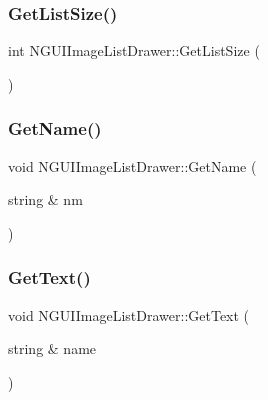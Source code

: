 \subsubsection{\texorpdfstring{Get\+List\+Size()}{GetListSize()}}
{\footnotesize\ttfamily int N\+G\+U\+I\+Image\+List\+Drawer\+::\+Get\+List\+Size (\begin{DoxyParamCaption}{ }\end{DoxyParamCaption})}

\hypertarget{class_n_g_u_i_image_list_drawer_a02cfec1a6feb717bedfef1183a0b411e}{}\label{class_n_g_u_i_image_list_drawer_a02cfec1a6feb717bedfef1183a0b411e} 
\subsubsection{\texorpdfstring{Get\+Name()}{GetName()}}
{\footnotesize\ttfamily void N\+G\+U\+I\+Image\+List\+Drawer\+::\+Get\+Name (\begin{DoxyParamCaption}\item[{string \&}]{nm }\end{DoxyParamCaption})}

\hypertarget{class_n_g_u_i_image_list_drawer_a84292773acd499aa26dabcf9fcd21ed1}{}\label{class_n_g_u_i_image_list_drawer_a84292773acd499aa26dabcf9fcd21ed1} 
\subsubsection{\texorpdfstring{Get\+Text()}{GetText()}}
{\footnotesize\ttfamily void N\+G\+U\+I\+Image\+List\+Drawer\+::\+Get\+Text (\begin{DoxyParamCaption}\item[{string \&}]{name }\end{DoxyParamCaption})}

\hypertarget{class_n_g_u_i_image_list_drawer_a239142ce1ace60fea54acc5535466323}{}\label{class_n_g_u_i_image_list_drawer_a239142ce1ace60fea54acc5535466323} 
